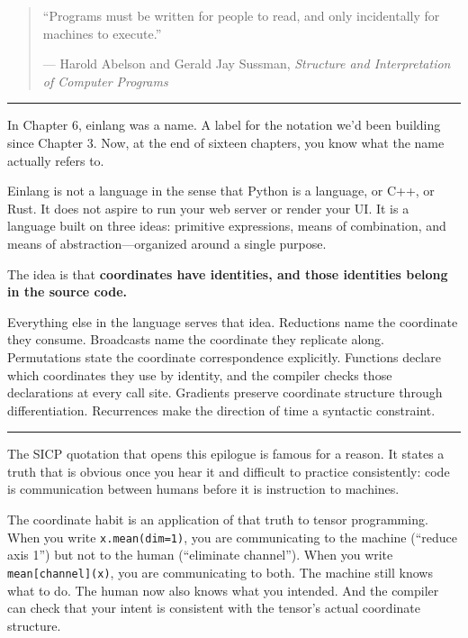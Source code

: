 \documentclass[11pt,]{article}
\begin{document}
\begin{quote}
``Programs must be written for people to read, and only incidentally for
machines to execute.''

--- Harold Abelson and Gerald Jay Sussman, \emph{Structure and
Interpretation of Computer Programs}
\end{quote}

\begin{center}\rule{0.5\linewidth}{0.4pt}\end{center}

In Chapter 6, einlang was a name. A label for the notation we'd been
building since Chapter 3. Now, at the end of sixteen chapters, you know
what the name actually refers to.

Einlang is not a language in the sense that Python is a language, or
C++, or Rust. It does not aspire to run your web server or render your
UI. It is a language built on three ideas: primitive expressions, means
of combination, and means of abstraction---organized around a single
purpose.

The idea is that \textbf{coordinates have identities, and those
identities belong in the source code.}

Everything else in the language serves that idea. Reductions name the
coordinate they consume. Broadcasts name the coordinate they replicate
along. Permutations state the coordinate correspondence explicitly.
Functions declare which coordinates they use by identity, and the
compiler checks those declarations at every call site. Gradients
preserve coordinate structure through differentiation. Recurrences make
the direction of time a syntactic constraint.

\begin{center}\rule{0.5\linewidth}{0.4pt}\end{center}

The SICP quotation that opens this epilogue is famous for a reason. It
states a truth that is obvious once you hear it and difficult to
practice consistently: code is communication between humans before it is
instruction to machines.

The coordinate habit is an application of that truth to tensor
programming. When you write \texttt{x.mean(dim=1)}, you are
communicating to the machine (``reduce axis 1'') but not to the human
(``eliminate channel''). When you write \texttt{mean{[}channel{]}(x)},
you are communicating to both. The machine still knows what to do. The
human now also knows what you intended. And the compiler can check that
your intent is consistent with the tensor's actual coordinate structure.
\end{document}
